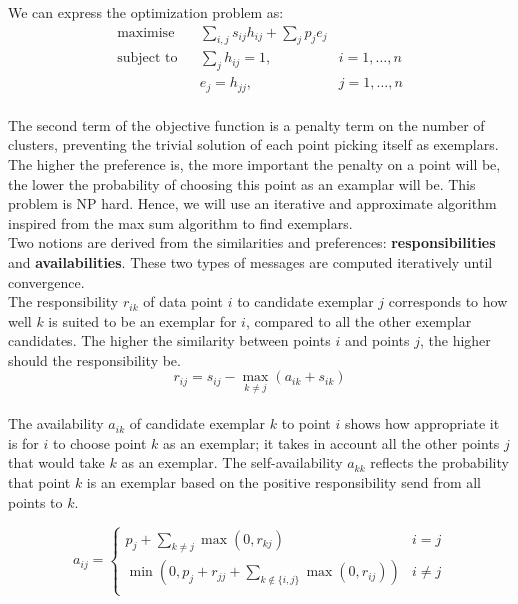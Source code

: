 \documentclass{ipol}
\begin{document}
We can express the optimization problem as:
\begin{equation*}
\renewcommand{\arraystretch}{2}
\begin{array}{ccll}
\text{maximise} & & \sum_{i, j} s_{ij} h_{ij} + \sum_{j} p_j e_j & \\
\text{subject to} &  & \sum_{j} h_{ij} = 1, & i = 1, \dots, n \\
		  &  & e_{j} = h_{jj}, & j = 1, \dots, n\\
\end{array}
\end{equation*}


The second term of the objective function is a penalty term on the number of clusters, preventing the
trivial solution of each point picking itself as exemplars. The higher the
preference is, the more important the penalty on a point will be, the lower
the probability of choosing this point as an examplar will be. This problem is
NP hard. Hence, we will use an iterative and approximate algorithm inspired
from the max sum algorithm to find exemplars. \\

Two notions are derived from the similarities and preferences:
\textbf{responsibilities} and \textbf{availabilities}. These two types of
messages are computed iteratively until convergence.\\

The responsibility $r_{ik}$ of data point $i$ to
candidate exemplar $j$ corresponds to how well $k$ is suited to be an exemplar
for $i$, compared to all the other exemplar candidates. The higher the
similarity between points $i$ and points $j$, the higher should the
responsibility be.
\begin{equation*}
r_{ij} = s_{ij} - \max_{k \neq j} (a_{ik} + s_{ik})
\end{equation*}
\\

The availability $a_{ik}$ of candidate exemplar $k$ to point $i$ shows how
appropriate it is for $i$ to choose point $k$ as an exemplar; it takes in account
all the other points $j$ that would take $k$ as an exemplar. The
self-availability $a_{kk}$ reflects the probability that point $k$ is an
exemplar based on the positive responsibility send from all points to $k$.

\begin{equation*}
a_{ij} = \begin{cases}
	    p_j + \sum_{k \neq j} \max(0, r_{kj}) &  i = j \\
	    \min ( 0, p_j + r_{jj} + \sum_{k \notin \{i, j\} } \max (0, r_{ij}))
	    & i \neq j\\
	 \end{cases}
\end{equation*}
\end{document}
